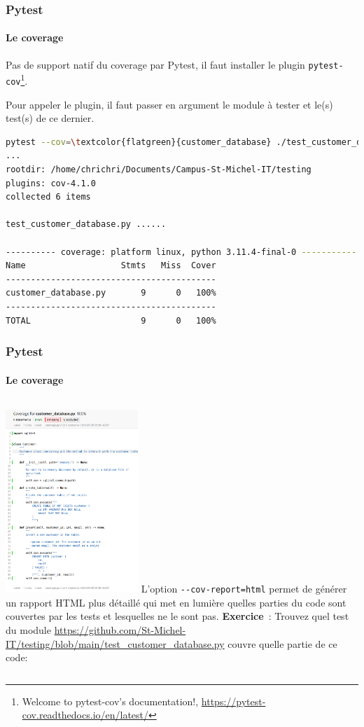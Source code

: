 \documentclass{beamer}
\begin{document}
    \begin{frame}[fragile]
        \frametitle{Pytest}
        \framesubtitle{Le coverage}
        \transdissolve
        Pas de support natif du coverage par Pytest, il faut installer le plugin \lstinline{pytest-cov}\footnote{Welcome to pytest-cov’s documentation!, \url{https://pytest-cov.readthedocs.io/en/latest/}}.

        Pour appeler le plugin, il faut passer en argument le module à tester et le(s) test(s) de ce dernier.


        \begin{lstlisting}[language=sh]
pytest --cov=\textcolor{flatgreen}{customer_database} ./test_customer_database.py
...
rootdir: /home/chrichri/Documents/Campus-St-Michel-IT/testing
plugins: cov-4.1.0
collected 6 items

test_customer_database.py ......                                                                                                                                                                                                 [100%]

---------- coverage: platform linux, python 3.11.4-final-0 -----------
Name                   Stmts   Miss  Cover
------------------------------------------
customer_database.py       9      0   100%
------------------------------------------
TOTAL                      9      0   100%
        \end{lstlisting}

    \end{frame}

    \begin{frame}
        \frametitle{Pytest}
        \framesubtitle{Le coverage}
        \transdissolve
        \begin{columns}

            \centering
            \includegraphics[width=5cm]{image/html-coverage.png}
            L'option \lstinline{--cov-report=html} permet de générer un rapport HTML plus détaillé qui met en lumière quelles parties du code sont couvertes par les tests et lesquelles ne le sont pas.
            \bigbreak
            \textbf{Exercice}~: Trouvez quel test du module \url{https://github.com/St-Michel-IT/testing/blob/main/test_customer_database.py} couvre quelle partie de ce code:
        \end{columns}

    \end{frame}
\end{document}
